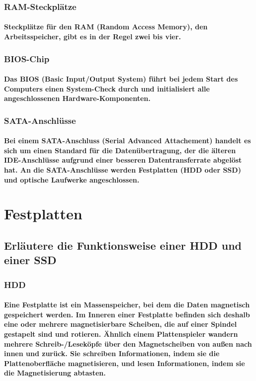\documentclass[a4paper]{article}
\begin{document}
    \subsubsection{\color{codegreen}RAM-Steckplätze}
    \paragraph{\color{codegreen}Steckplätze für den RAM (Random Access Memory), den Arbeitsspeicher, gibt es in der Regel zwei bis vier.}
    \subsubsection{\color{codegreen}BIOS-Chip}
    \paragraph{\color{codegreen}Das BIOS (Basic Input/Output System) führt bei jedem Start des Computers einen System-Check durch und initialisiert alle angeschlossenen Hardware-Komponenten.}
    \subsubsection{\color{codegreen}SATA-Anschlüsse}
    \paragraph{\color{codegreen}Bei einem SATA-Anschluss (Serial Advanced Attachement) handelt es sich um einen Standard für die Datenübertragung, der die älteren IDE-Anschlüsse aufgrund einer besseren Datentransferrate abgelöst hat. An die SATA-Anschlüsse werden Festplatten (HDD oder SSD) und optische Laufwerke angeschlossen.}

    \section{Festplatten}\label{sec:festplatten}
    \subsection{\color{red} Erläutere die Funktionsweise einer HDD und einer SSD}\label{subsec:erläutere-die-funktionsweise-einer-hdd-und-einer-ssd}
    \subsubsection{\color{codegreen} HDD}
    \paragraph{\color{codegreen}Eine Festplatte ist ein Massenspeicher, bei dem die Daten magnetisch gespeichert werden. Im Inneren einer Festplatte befinden sich deshalb eine oder mehrere magnetisierbare Scheiben, die auf einer Spindel gestapelt sind und rotieren. Ähnlich einem Plattenspieler wandern mehrere Schreib-/Leseköpfe über den Magnetscheiben von außen nach innen und zurück. Sie schreiben Informationen, indem sie die Plattenoberfläche magnetisieren, und lesen Informationen, indem sie die Magnetisierung abtasten.}
\end{document}
